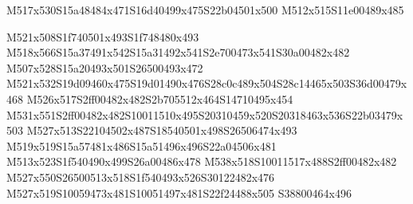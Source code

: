 \documentclass{article}
\begin{document}
\begin{multicols}{2}
\begin{center}
M517x530S15a48484x471S16d40499x475S22b04501x500 M512x515S11e00489x485 
\end{center}






M521x508S1f740501x493S1f748480x493 M518x566S15a37491x542S15a31492x541S2e700473x541S30a00482x482 M507x528S15a20493x501S26500493x472 M521x532S19d09460x475S19d01490x476S28c0c489x504S28c14465x503S36d00479x468 M526x517S2ff00482x482S2b705512x464S14710495x454 M531x551S2ff00482x482S10011510x495S20310459x520S20318463x536S22b03479x503 M527x513S22104502x487S18540501x498S26506474x493 M519x519S15a57481x486S15a51496x496S22a04506x481 M513x523S1f540490x499S26a00486x478 M538x518S10011517x488S2ff00482x482 M527x550S26500513x518S1f540493x526S30122482x476 M527x519S10059473x481S10051497x481S22f24488x505 S38800464x496





\end{multicols}
\end{document}
